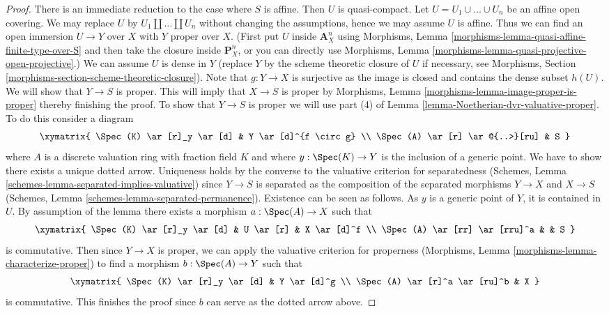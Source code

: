 \begin{proof}
There is an immediate reduction to the case where $S$ is affine.
Then $U$ is quasi-compact.
Let $U = U_1 \cup \ldots \cup U_n$ be an affine open covering.
We may replace $U$ by $U_1 \amalg \ldots \amalg U_n$ without
changing the assumptions, hence we may assume $U$ is affine.
Thus we can find an open immersion $U \to Y$ over $X$
with $Y$ proper over $X$. (First put $U$ inside $\mathbf{A}^n_X$
using Morphisms, Lemma \ref{morphisms-lemma-quasi-affine-finite-type-over-S}
and then take the closure inside $\mathbf{P}^n_X$, or you can directly
use Morphisms, Lemma \ref{morphisms-lemma-quasi-projective-open-projective}.)
We can assume $U$ is dense in $Y$ (replace $Y$ by the scheme theoretic
closure of $U$ if necessary, see Morphisms, Section
\ref{morphisms-section-scheme-theoretic-closure}).
Note that $g : Y \to X$ is surjective as the image is closed
and contains the dense subset $h(U)$.
We will show that $Y \to S$ is proper. This will imply that
$X \to S$ is proper by
Morphisms, Lemma \ref{morphisms-lemma-image-proper-is-proper}
thereby finishing the proof.
To show that $Y \to S$ is proper we will use
part (4) of Lemma \ref{lemma-Noetherian-dvr-valuative-proper}.
To do this consider a diagram
$$
\xymatrix{
\Spec(K) \ar[r]_y \ar[d] & Y \ar[d]^{f \circ g} \\
\Spec(A) \ar[r] \ar@{..>}[ru] & S
}
$$
where $A$ is a discrete valuation ring with fraction field $K$
and where $y : \Spec(K) \to Y$ is the inclusion of a generic point.
We have to show there exists a unique dotted arrow.
Uniqueness holds by the converse to the valuative criterion
for separatedness
(Schemes, Lemma \ref{schemes-lemma-separated-implies-valuative})
since $Y \to S$ is separated as the
composition of the separated morphisms $Y \to X$ and $X \to S$
(Schemes, Lemma \ref{schemes-lemma-separated-permanence}).
Existence can be seen as follows.
As $y$ is a generic point of $Y$, it is contained in $U$.
By assumption of the lemma
there exists a morphism $a : \Spec(A) \to X$ such that
$$
\xymatrix{
\Spec(K) \ar[r]_y \ar[d] & U \ar[r] & X \ar[d]^f \\
\Spec(A) \ar[rr] \ar[rru]^a & & S
}
$$
is commutative. Then since $Y \to X$ is proper, we can
apply the valuative criterion for properness
(Morphisms, Lemma \ref{morphisms-lemma-characterize-proper})
to find a morphism $b : \Spec(A) \to Y$ such that
$$
\xymatrix{
\Spec(K) \ar[r]_y \ar[d] & Y \ar[d]^g \\
\Spec(A) \ar[r]^a \ar[ru]^b & X
}
$$
is commutative. This finishes the proof since
$b$ can serve as the dotted arrow above.
\end{proof}

